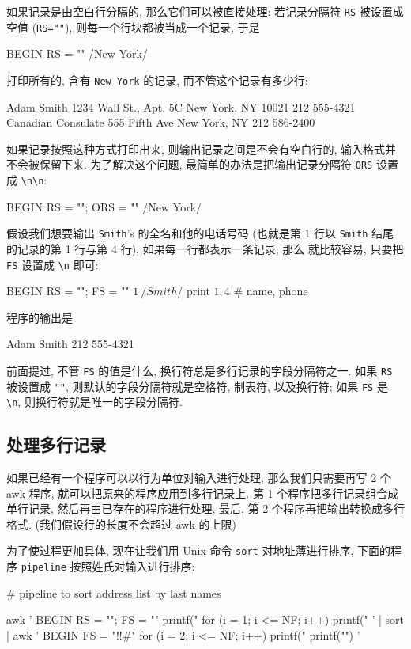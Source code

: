 如果记录是由空白行分隔的, 那么它们可以被直接处理: 若记录分隔符 \verb'RS'
被设置成空值 (\verb'RS=""'), 则每一个行块都被当成一个记录, 于是 
\begin{awkcode}
    BEGIN { RS = "" }
    /New York/
\end{awkcode}
打印所有的, 含有 \verb'New York' 的记录, 而不管这个记录有多少行:
\begin{shell}
    Adam Smith
    1234 Wall St., Apt. 5C
    New York, NY 10021
    212 555-4321
    Canadian Consulate
    555 Fifth Ave
    New York, NY
    212 586-2400
\end{shell}
如果记录按照这种方式打印出来, 则输出记录之间是不会有空白行的, 输入格式并
不会被保留下来. 为了解决这个问题, 最简单的办法是把输出记录分隔符 \verb'ORS'
设置成 \verb'\n\n':
\begin{awkcode}
    BEGIN { RS = ""; ORS = "\n\n" }
    /New York/
\end{awkcode}

假设我们想要输出 \verb'Smith''s 的全名和他的电话号码 (也就是第 1 行以 
\verb'Smith' 结尾的记录的第 1 行与第 4 行), 如果每一行都表示一条记录, 那么 
就比较容易, 只要把 \verb'FS' 设置成 \verb'\n' 即可:
\begin{awkcode}
    BEGIN           { RS = ""; FS = "\n" }
    $1 ~ /Smith$/   { print $1, $4 } # name, phone
\end{awkcode}
程序的输出是 
\begin{shell}
    Adam Smith 212 555-4321
\end{shell}
前面提过, 不管 \verb'FS' 的值是什么, 换行符总是多行记录的字段分隔符之一.
如果 \verb'RS' 被设置成 \verb'""', 则默认的字段分隔符就是空格符, 制表符,
以及换行符; 如果 \verb'FS' 是 \verb'\n', 则换行符就是唯一的字段分隔符.

\subsection{处理多行记录}
\label{subsec:processing_multiline_records}

如果已经有一个程序可以以行为单位对输入进行处理, 那么我们只需要再写 2 个
awk 程序, 就可以把原来的程序应用到多行记录上. 第 1 个程序把多行记录组合成
单行记录, 然后再由已存在的程序进行处理, 最后, 第 2 个程序再把输出转换成多行
格式. (我们假设行的长度不会超过 awk 的上限)

为了使过程更加具体, 现在让我们用 Unix 命令 \verb'sort' 对地址薄进行排序,
下面的程序 \verb'pipeline' 按照姓氏对输入进行排序:
\begin{awkcode}
    # pipeline to sort address list by last names

    awk '
    BEGIN { RS = ""; FS = "\n" }
          { printf("%
            for (i = 1; i <= NF; i++)
                printf("%
          }
    ' |
    sort |
    awk '
    BEGIN { FS = "!!#" }
          { for (i = 2; i <= NF; i++)
                printf("%
            printf("\n")
          }
    '
\end{awkcode}

